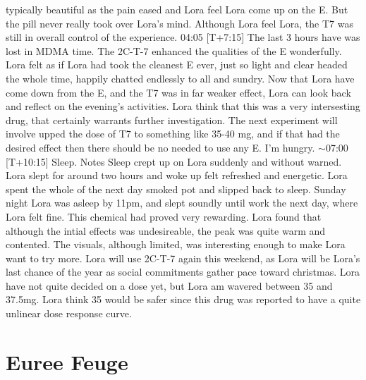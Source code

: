 \documentclass[12pt]{book}
\begin{document}
typically beautiful as the pain eased and Lora feel Lora come up on the E. But the pill never really took over Lora's mind. Although Lora feel Lora, the T7 was still in overall control of the experience. 04:05 [T+7:15] The last 3  hours have was lost in MDMA time. The 2C-T-7 enhanced the qualities of the E wonderfully. Lora felt as if Lora had took the cleanest E ever, just so light and clear headed the whole time, happily chatted endlessly to all and sundry. Now that Lora have come down from the E, and the T7 was in far weaker effect, Lora can look back and reflect on the evening's activities. Lora think that this was a very intersesting drug, that certainly warrants further investigation. The next experiment will involve upped the dose of T7 to something like 35-40 mg, and if that had the desired effect then there should be no needed to use any E. I'm hungry. $\sim$07:00 [T+10:15] Sleep. Notes Sleep crept up on Lora suddenly and without warned. Lora slept for around two hours and woke up felt refreshed and energetic. Lora spent the whole of the next day smoked pot and slipped back to sleep. Sunday night Lora was asleep by 11pm, and slept soundly until work the next day, where Lora felt fine. This chemical had proved very rewarding. Lora found that although the intial effects was undesireable, the peak was quite warm and contented. The visuals, although limited, was interesting enough to make Lora want to try more. Lora will use 2C-T-7 again this weekend, as Lora will be Lora's last chance of the year as social commitments gather pace toward christmas. Lora have not quite decided on a dose yet, but Lora am wavered between 35 and 37.5mg. Lora think 35 would be safer since this drug was reported to have a quite unlinear dose response curve.



\chapter{Euree Feuge}
\end{document}
